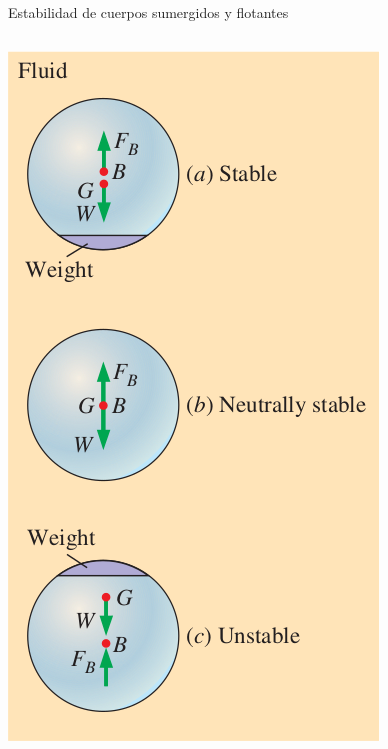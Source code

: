 \documentclass [xcolor=svgnames, t] {beamer}
\begin{document}
\begin{frame}{Estabilidad de cuerpos sumergidos y flotantes}
\begin{columns}
\begin{textblock*}{4cm}
\includegraphics[width=\textwidth]{rota}
\end{textblock*}
\end{columns}
\end{frame}
\end{document}
